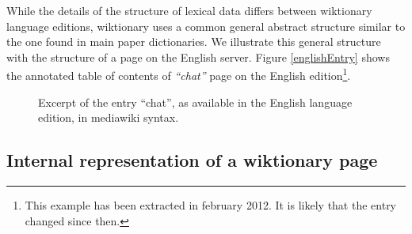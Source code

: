 \documentclass[10pt, a4paper]{article}
\begin{document}
While the details of the structure of lexical data differs between wiktionary language editions, wiktionary uses a common general abstract structure similar to the one found in main paper dictionaries. We illustrate this general structure with the structure of a page on the English server. Figure \ref{englishEntry} shows the annotated table of contents of \emph{``chat''} page on the English edition\footnote{This example has been extracted in february 2012. It is likely that the entry changed since then.}.

\begin{figure}[htb]
\caption{Excerpt of the entry ``chat'', as available in the English language edition, in mediawiki syntax.}
\label{extr:sample}
\end{figure}

\subsection{Internal representation of a wiktionary page}
\end{document}
